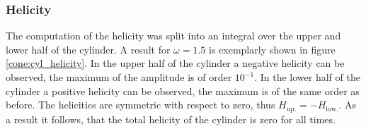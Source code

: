 \subsubsection{Helicity}

The computation of the helicity was split into an integral over the upper and lower half
of the cylinder.  A result for $\omega=1.5$ is exemplarly shown in figure \ref{cone:cyl_helicity}.
In the upper half of the cylinder a negative helicity can be observed, the maximum of the amplitude is of order $10^{-1}$.
In the lower half of the cylinder a positive helicity can be observed, the maximum is of the same order as before.
The helicities are symmetric with respect to zero, thus $H_{\text{up.}} = -H_{\text{low.}}$.
As a result it follows, that the total helicity of the cylinder is zero for all times.


